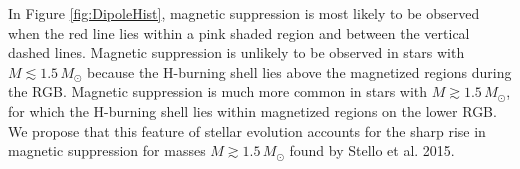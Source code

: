In Figure \ref{fig:DipoleHist}, magnetic suppression is most likely to be observed when the red line lies within a pink shaded region and between the vertical dashed lines. Magnetic suppression is unlikely to be observed in stars with $M \lesssim 1.5 \, M_\odot$ because the H-burning shell lies above the magnetized regions during the RGB. Magnetic suppression is much more common in stars with $M \gtrsim 1.5 \, M_\odot$, for which the H-burning shell lies within magnetized regions on the lower RGB. We propose that this feature of stellar evolution accounts for the sharp rise in magnetic suppression for masses $M \gtrsim 1.5 \, M_\odot$ found by Stello et al. 2015.
